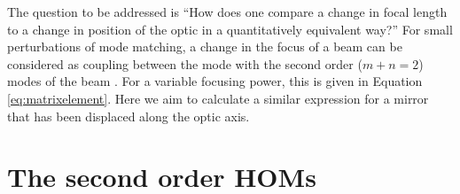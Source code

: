 The question to be addressed is ``How does one compare a change in focal length to a change in position of the optic in a quantitatively equivalent way?'' %
For small perturbations of mode matching, a change in the focus of a beam can be considered as coupling between the  mode with the second order ($m+n=2$) modes of the beam \cite{Anderson1984}. %
For a variable focusing power, this is given in Equation \ref{eq:matrixelement}. %
Here we aim to calculate a similar expression for a mirror  that has been displaced along the optic axis.

\section{The second order HOMs}
